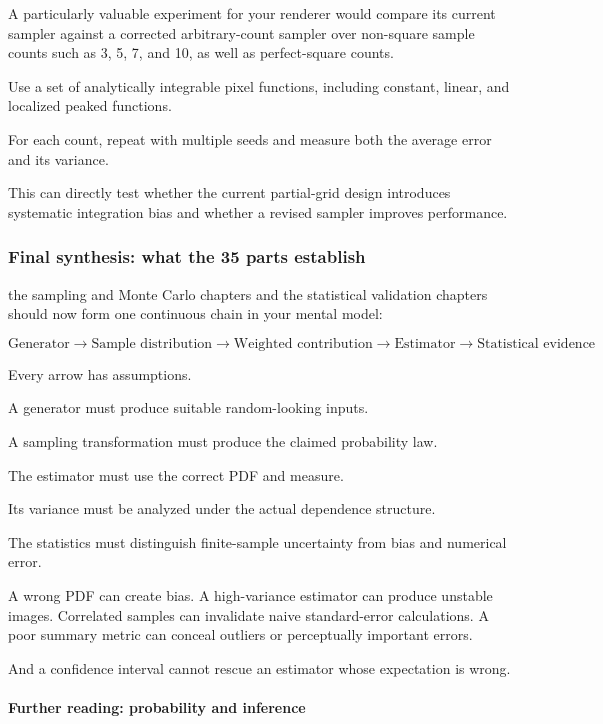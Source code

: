 A particularly valuable experiment for your renderer would compare its current sampler against a corrected arbitrary-count sampler over non-square sample counts such as 3, 5, 7, and 10, as well as perfect-square counts.

Use a set of analytically integrable pixel functions, including constant, linear, and localized peaked functions.

For each count, repeat with multiple seeds and measure both the average error and its variance.

This can directly test whether the current partial-grid design introduces systematic integration bias and whether a revised sampler improves performance.

\subsubsection{Final synthesis: what the 35 parts establish}\label{final-synthesis-what-the-35-parts-establish}

the sampling and Monte Carlo chapters and the statistical validation chapters should now form one continuous chain in your mental model:

\[
 \boxed{ \text{Generator} \rightarrow \text{Sample distribution} \rightarrow \text{Weighted contribution} \rightarrow \text{Estimator} \rightarrow \text{Statistical evidence} }
\]

Every arrow has assumptions.

A generator must produce suitable random-looking inputs.

A sampling transformation must produce the claimed probability law.

The estimator must use the correct PDF and measure.

Its variance must be analyzed under the actual dependence structure.

The statistics must distinguish finite-sample uncertainty from bias and numerical error.

A wrong PDF can create bias. A high-variance estimator can produce unstable images. Correlated samples can invalidate naive standard-error calculations. A poor summary metric can conceal outliers or perceptually important errors.

And a confidence interval cannot rescue an estimator whose expectation is wrong.

\paragraph{Further reading: probability and inference}\label{further-reading-probability-and-inference}

